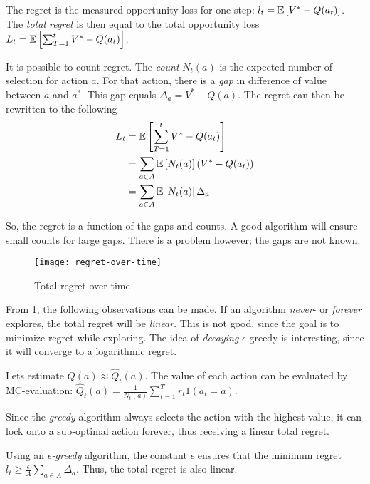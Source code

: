The regret is the measured opportunity loss for one step: $l_t = \operatorname{\mathbb{E}}\left[V^* - Q(a_t)\right]$. The \textit{total regret} is then equal to the total opportunity loss $L_t = \operatorname{\mathbb{E}}\left[\sum_{T = 1}^{t} V^* - Q(a_t)\right]$.

It is possible to count regret. The \textit{count} $N_t(a)$ is the expected number of selection for action $a$. For that action, there is a \textit{gap} in difference of value between $a$ and $a^*$. This gap equals $\Delta_a = V^* - Q(a)$. The regret can then be rewritten to the following
\begin{equation*}
	\begin{aligned}
		L_t & = \operatorname{\mathbb{E}}\left[\sum_{T = 1}^{t} V^* - Q(a_t)\right]\\
		    & = \sum_{a \in A} \operatorname{\mathbb{E}}\left[N_t(a)\right] (V^* - Q(a_t))\\
		    & = \sum_{a \in A} \operatorname{\mathbb{E}}\left[N_t(a)\right] \Delta_a
	\end{aligned}
\end{equation*}

So, the regret is a function of the gaps and counts. A good algorithm will ensure small counts for large gaps. There is a problem however; the gaps are not known.

\begin{figure}[H]
	\centering
	\texttt{[image: regret-over-time]}
	\caption{Total regret over time}
	\label{fig:regret-over-time}
\end{figure}

From \ref{fig:regret-over-time}, the following observations can be made. If an algorithm \textit{never}- or \textit{forever} explores, the total regret will be \textit{linear}. This is not good, since the goal is to minimize regret while exploring. The idea of \textit{decaying} $\epsilon$-greedy is interesting, since it will converge to a logarithmic regret.

Lets estimate $Q(a) \approx \hat{Q}_t(a)$. The value of each action can be evaluated by MC-evaluation: $\hat{Q}_t(a) = \frac{1}{N_t(a)} \sum_{t = 1}^{T} r_t 1(a_t = a)$.

Since the \textit{greedy} algorithm always selects the action with the highest value, it can lock onto a sub-optimal action forever, thus receiving a linear total regret.

Using an \textit{$\epsilon$-greedy} algorithm, the constant $\epsilon$ ensures that the minimum regret $l_t \geq \frac{\epsilon}{A} \sum_{a \in A} \Delta_a$. Thus, the total regret is also linear.


